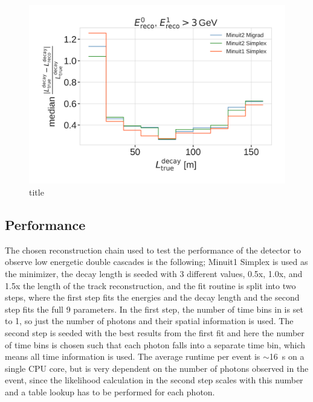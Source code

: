 \begin{figure}[h]
    \includegraphics{figures/results/190605_reco_optimization/minimizer_checks_median_decay_length_resolution_Good + L7 + reco E1,E2 above 3.png}
    \caption[short]{title}
\end{figure}


\subsection{Performance}

The chosen reconstruction chain used to test the performance of the detector to observe low energetic double cascades is the following; Minuit1 Simplex is used as the minimizer, the decay length is seeded with 3 different values, 0.5x, 1.0x, and 1.5x the length of the track reconstruction, and the fit routine is split into two steps, where the first step fits the energies and the decay length and the second step fits the full 9 parameters. In the first step, the number of time bins in  is set to 1, so just the number of photons and their spatial information is used. The second step is seeded with the best results from the first fit and here the number of time bins is chosen such that each photon falls into a separate time bin, which means all time information is used. The average runtime per event is $\sim$\SI{16}{\second} on a single CPU core, but is very dependent on the number of photons observed in the event, since the likelihood calculation in the second step scales with this number and a table lookup has to be performed for each photon.

